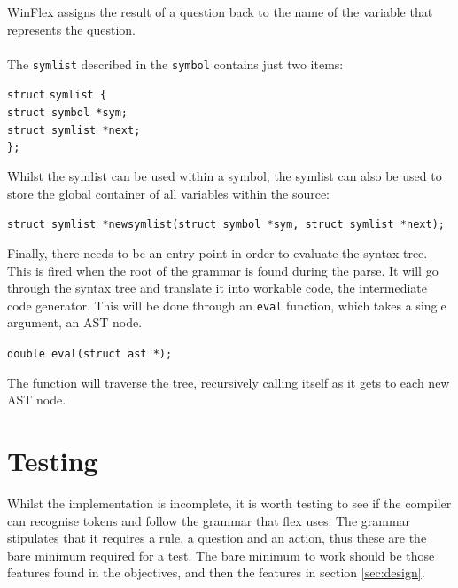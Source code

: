 \documentclass[12pt]{report}
\begin{document}
WinFlex assigns the result of a question back to the name of the variable that represents the question.\\
\\
The \texttt{symlist} described in the \texttt{symbol} contains just two items:\\
\begin{tabbing}
	\texttt{struct} \= \texttt{symlist \{}\\
	\> \texttt{struct symbol *sym;}\\
	\> \texttt{struct symlist *next;}\\
	\texttt{\};}\\
\end{tabbing}
Whilst the symlist can be used within a symbol, the symlist can also be used to store the global container of all variables within the source:\\
\begin{center}
	\texttt{struct symlist *newsymlist(struct symbol *sym, struct symlist *next);}\\
\end{center}
Finally, there needs to be an entry point in order to evaluate the syntax tree.  This is fired when the root of the grammar is found during the parse.  It will go through the syntax tree and translate it into workable code, the intermediate code generator.  This will be done through an \texttt{eval} function, which takes a single argument, an AST node.\\
\begin{center}
	\texttt{double eval(struct ast *);}\\
\end{center}
The function will traverse the tree, recursively calling itself as it gets to each new AST node.
\chapter{Testing}
Whilst the implementation is incomplete, it is worth testing to see if the compiler can recognise tokens and follow the grammar that flex uses.  The grammar stipulates that it requires a rule, a question and an action, thus these are the bare minimum required for a test.  The bare minimum to work should be those features found in the objectives, and then the features in section \ref{sec:design}.\\
\\
\end{document}
